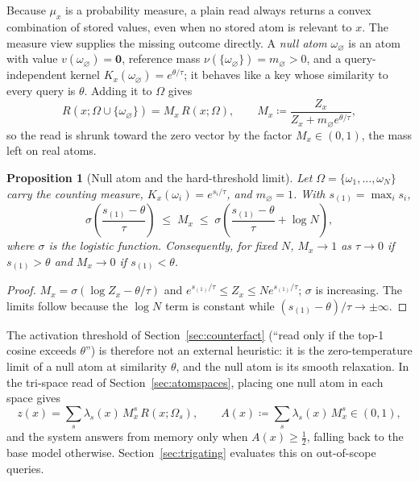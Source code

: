 \documentclass[preprint,12pt]{elsarticle}
\newtheorem{proposition}{Proposition}
\newcommand{\Om}{\Omega}
\newif\ifmarkchanges %
\newcommand{\rev}[1]{\ifmarkchanges{\color{blue}#1}\else#1\fi} %
\providecommand{\DIFaddtex}[1]{{\protect\color{blue}\uwave{#1}}} %
\providecommand{\DIFaddbegin}{} %
\providecommand{\DIFadd}[1]{\texorpdfstring{\DIFaddtex{#1}}{#1}} %
\providecommand{\DIFaddincludegraphics}[2][]{{\color{blue}\fbox{\DIFOincludegraphics[#1]{#2}}}} %
\DeclareRobustCommand{\DIFaddbegin}{\DIFOaddbegin \let\includegraphics\DIFaddincludegraphics} %
\begin{document}
\DIFaddbegin \subsection{\DIFadd{Null Atoms and Abstention}}
\label{sec:null_atoms}

\rev{Because $\mu_x$ is a probability measure, a plain read always returns a convex combination of stored values, even when no stored atom is relevant to $x$. The measure view supplies the missing outcome directly. A \emph{null atom} $\omega_\varnothing$ is an atom with value $v(\omega_\varnothing)=\mathbf 0$, reference mass $\nu(\{\omega_\varnothing\})=m_\varnothing>0$, and a query-independent kernel $K_x(\omega_\varnothing)=e^{\theta/\tau}$; it behaves like a key whose similarity to every query is $\theta$. Adding it to $\Om$ gives
\[
  R(x;\Om\cup\{\omega_\varnothing\}) = M_x\,R(x;\Om), \qquad
  M_x \coloneqq \frac{Z_x}{Z_x+m_\varnothing e^{\theta/\tau}},
\]
so the read is shrunk toward the zero vector by the factor $M_x\in(0,1)$, the mass left on real atoms.}

\begin{proposition}[Null atom and the hard-threshold limit]
\label{prop:null_atom}
\rev{Let $\Om=\{\omega_1,\dots,\omega_N\}$ carry the counting measure, $K_x(\omega_i)=e^{s_i/\tau}$, and $m_\varnothing=1$. With $s_{(1)}=\max_i s_i$,
\[
  \sigma\!\left(\frac{s_{(1)}-\theta}{\tau}\right) \;\le\; M_x \;\le\; \sigma\!\left(\frac{s_{(1)}-\theta}{\tau}+\log N\right),
\]
where $\sigma$ is the logistic function. Consequently, for fixed $N$, $M_x\to 1$ as $\tau\to 0$ if $s_{(1)}>\theta$ and $M_x\to 0$ if $s_{(1)}<\theta$.}
\end{proposition}

\begin{proof}
\rev{$M_x=\sigma(\log Z_x-\theta/\tau)$ and $e^{s_{(1)}/\tau}\le Z_x\le N e^{s_{(1)}/\tau}$; $\sigma$ is increasing. The limits follow because the $\log N$ term is constant while $(s_{(1)}-\theta)/\tau\to\pm\infty$.} \qedhere
\end{proof}

\rev{The activation threshold of Section~\ref{sec:counterfact} (``read only if the top-1 cosine exceeds $\theta$'') is therefore not an external heuristic: it is the zero-temperature limit of a null atom at similarity $\theta$, and the null atom is its smooth relaxation. In the tri-space read of Section~\ref{sec:atomspaces}, placing one null atom in each space gives
\[
  z(x)=\sum_{s}\lambda_s(x)\,M_{x}^{s}\,R(x;\Om_s), \qquad A(x)\coloneqq\sum_s\lambda_s(x)\,M_x^s\in(0,1),
\]
and the system answers from memory only when $A(x)\ge\tfrac12$, falling back to the base model otherwise. Section~\ref{sec:trigating} evaluates this on out-of-scope queries.}
\end{document}
